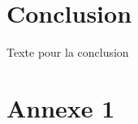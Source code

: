 \documentclass{pjsivi}
\begin{document}
\chapter*{Conclusion} 

Texte pour la conclusion

 

\appendix  %
\chapter*{Annexe 1}
\end{document}
